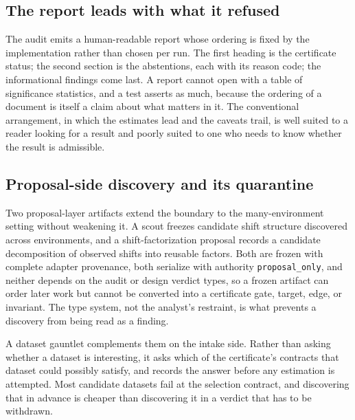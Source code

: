 \documentclass[11pt]{article}
\begin{document}
\subsection{The report leads with what it refused}

The audit emits a human-readable report whose ordering is fixed by the
implementation rather than chosen per run. The first heading is the certificate
status; the second section is the abstentions, each with its reason code; the
informational findings come last. A report cannot open with a table of
significance statistics, and a test asserts as much, because the ordering of a
document is itself a claim about what matters in it. The conventional
arrangement, in which the estimates lead and the caveats trail, is well suited
to a reader looking for a result and poorly suited to one who needs to know
whether the result is admissible.

\subsection{Proposal-side discovery and its quarantine}

Two proposal-layer artifacts extend the boundary to the many-environment
setting without weakening it. A scout freezes candidate shift structure
discovered across environments, and a shift-factorization proposal records a
candidate decomposition of observed shifts into reusable factors. Both are
frozen with complete adapter provenance, both serialize with authority
\texttt{proposal\_only}, and neither depends on the audit or design verdict
types, so a frozen artifact can order later work but cannot be converted into a
certificate gate, target, edge, or invariant. The type system, not the
analyst's restraint, is what prevents a discovery from being read as a finding.

A dataset gauntlet complements them on the intake side. Rather than asking
whether a dataset is interesting, it asks which of the certificate's contracts
that dataset could possibly satisfy, and records the answer before any
estimation is attempted. Most candidate datasets fail at the selection contract,
and discovering that in advance is cheaper than discovering it in a verdict that
has to be withdrawn.

\printbibliography
\end{document}
